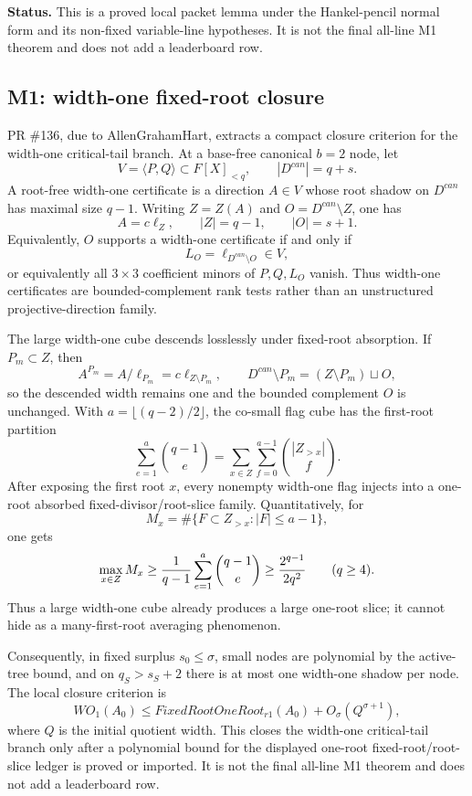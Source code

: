 \documentclass[11pt]{article}
\begin{document}
\textbf{Status.}  This is a proved local packet lemma under the Hankel-pencil
normal form and its non-fixed variable-line hypotheses.  It is not the final
all-line M1 theorem and does not add a leaderboard row.

\subsection{M1: width-one fixed-root closure}

PR \#136, due to AllenGrahamHart, extracts a compact closure criterion for the
width-one critical-tail branch.  At a base-free canonical \(b=2\) node, let
\[
  V=\langle P,Q\rangle\subset F[X]_{<q},\qquad |D^{can}|=q+s.
\]
A root-free width-one certificate is a direction \(A\in V\) whose root shadow
on \(D^{can}\) has maximal size \(q-1\).  Writing \(Z=Z(A)\) and
\(O=D^{can}\setminus Z\), one has
\[
  A=c\ell_Z,\qquad |Z|=q-1,\qquad |O|=s+1.
\]
Equivalently, \(O\) supports a width-one certificate if and only if
\[
  L_O=\ell_{D^{can}\setminus O}\in V,
\]
or equivalently all \(3\times3\) coefficient minors of \(P,Q,L_O\) vanish.
Thus width-one certificates are bounded-complement rank tests rather than an
unstructured projective-direction family.

The large width-one cube descends losslessly under fixed-root absorption.  If
\(P_m\subset Z\), then
\[
  A^{P_m}=A/\ell_{P_m}=c\ell_{Z\setminus P_m},\qquad
  D^{can}\setminus P_m=(Z\setminus P_m)\sqcup O,
\]
so the descended width remains one and the bounded complement \(O\) is
unchanged.  With \(a=\lfloor(q-2)/2\rfloor\), the co-small flag cube has the
first-root partition
\[
  \sum_{e=1}^a\binom{q-1}{e}
  =
  \sum_{x\in Z}\sum_{f=0}^{a-1}\binom{|Z_{>x}|}{f}.
\]
After exposing the first root \(x\), every nonempty width-one flag injects into
a one-root absorbed fixed-divisor/root-slice family.  Quantitatively, for
\[
  M_x=\#\{F\subset Z_{>x}: |F|\le a-1\},
\]
one gets
\[
  \max_{x\in Z}M_x
  \ge {1\over q-1}\sum_{e=1}^a\binom{q-1}{e}
  \ge {2^{q-1}\over 2q^2}\qquad(q\ge4).
\]
Thus a large width-one cube already produces a large one-root slice; it cannot
hide as a many-first-root averaging phenomenon.

Consequently, in fixed surplus \(s_0\le\sigma\), small nodes are polynomial by
the active-tree bound, and on \(q_S>s_S+2\) there is at most one width-one
shadow per node.  The local closure criterion is
\[
  WO_1(A_0)
  \le FixedRootOneRoot_{r1}(A_0)+O_\sigma(Q^{\sigma+1}),
\]
where \(Q\) is the initial quotient width.  This closes the width-one
critical-tail branch only after a polynomial bound for the displayed one-root
fixed-root/root-slice ledger is proved or imported.  It is not the final
all-line M1 theorem and does not add a leaderboard row.
\end{document}
